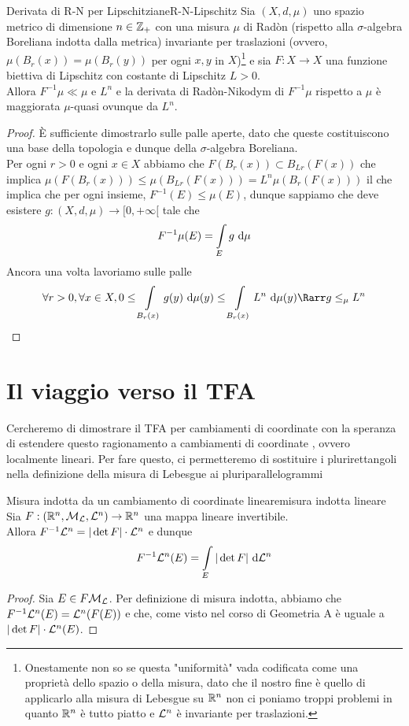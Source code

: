 \documentclass{article}
\begin{document}
\begin{proposition}{Derivata di R-N per Lipschitziane}{R-N-Lipschitz}
    Sia $(X,d,\mu)$ uno spazio metrico di dimensione $n \in \mathbb{Z}_+$ con una misura $\mu$ di Radòn (rispetto alla $\sigma$-algebra Boreliana indotta dalla metrica) invariante per traslazioni (ovvero, $\mu(B_r(x)) = \mu(B_r(y))$ per ogni $x,y$ in $X$)\footnote{Onestamente non so se questa "uniformità" vada codificata come una proprietà dello spazio o della misura, dato che il nostro fine è quello di applicarlo alla misura di Lebesgue su $\mathbb{R}^n$ non ci poniamo troppi problemi in quanto $\mathbb{R}^n$ è tutto piatto e $\mathcal{L}^n$ è invariante per traslazioni.} e sia $F:X \to X$ una funzione biettiva di Lipschitz con costante di Lipschitz $L>0$.\\
    Allora $F^{-1}\mu \ll \mu$ e $L^n$ e la derivata di Radòn-Nikodym di $F^{-1}\mu$ rispetto a $\mu$ è maggiorata $\mu$-quasi ovunque da $L^n$.
    \begin{proof}
        È sufficiente dimostrarlo sulle palle aperte, dato che queste costituiscono una base della topologia e dunque della $\sigma$-algebra Boreliana.\\
        Per ogni $r>0$ e ogni $x \in X$ abbiamo che  $F(B_r(x)) \subset B_{Lr}(F(x))$ che implica $\mu(F(B_r(x)))\le \mu(B_{Lr}(F(x))) = L^n\mu(B_r(F(x)))$ il che implica che per ogni insieme, $F^{-1}(E) \le \mu(E)$, dunque sappiamo che deve esistere $g: (X,d,\mu)\to [0,+\infty[$ tale che
        \[F^{-1}\mu(E) = \int\limits_E g \text{ d} \mu\]
        Ancora una volta lavoriamo sulle palle
        \[\forall r>0,\forall x \in X, 0\le \int\limits_{B_r(x)} g(y)\de \mu(y) \le \int\limits_{B_r(x)} L^n \de\mu(y) \Rarr g \le_\mu L^n \]
    \end{proof}
\end{proposition}

\section{Il viaggio verso il TFA}

Cercheremo di dimostrare il TFA per cambiamenti di coordinate  con la speranza di estendere questo ragionamento a cambiamenti di coordinate , ovvero localmente lineari. Per fare questo, ci permetteremo di sostituire i plurirettangoli nella definizione della misura di Lebesgue ai pluriparallelogrammi

\begin{lemma}{Misura indotta da un cambiamento di coordinate lineare}{misura indotta lineare}
    Sia $F: (\mathbb{R}^n, \mathcal{M}_{\mathcal{L}}, \mathcal{L}^n) \to \mathbb{R}^n$ una mappa lineare invertibile.\\
    Allora $F^{-1}\mathcal{L}^n = |\det F|\cdot \mathcal{L}^n$ e dunque
    \[F^{-1}\mathcal{L}^n(E) = \int\limits_E |\det F|\text{ d} \mathcal{L}^n\]
    \begin{proof}
        Sia $E \in F\mathcal{M}_{\mathcal{L}}$. Per definizione di misura indotta, abbiamo che $F^{-1}\mathcal{L}^n(E) = \mathcal{L}^n(F(E))$ e che, come visto nel corso di Geometria A è uguale a $|\det F|\cdot \mathcal{L}^n(E)$.
    \end{proof}
\end{lemma}
\end{document}
